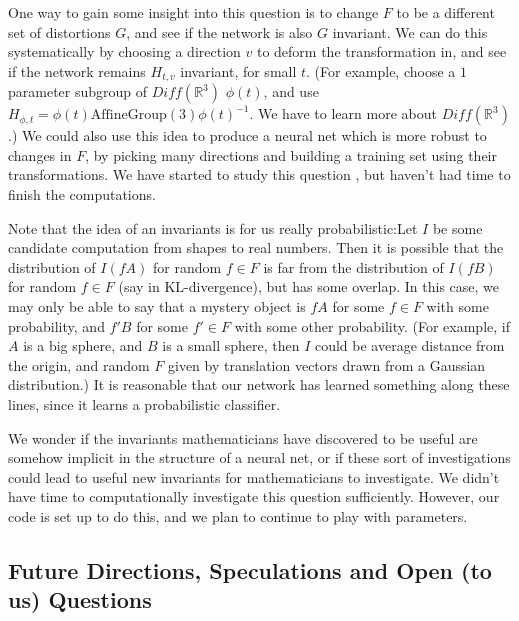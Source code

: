 \documentclass{article}
\begin{document}
One way to gain some insight into this question is to change $F$ to be a different set of distortions $G$, and see if the network is also $G$ invariant. We can do this systematically by choosing a direction $v$ to deform the transformation in, and see if the network remains $H_{t,v}$ invariant, for small $t$. (For example, choose a  $1$ parameter subgroup of $Diff(\mathbb{R}^3)$  $\phi(t)$, and use $H_{\phi, t} = \phi(t) \text{AffineGroup}(3) \phi(t)^{-1}$. We have to learn more about $Diff(\mathbb{R}^3)$.) We could also use this idea to produce a neural net which is more robust to changes in $F$, by picking many directions and building a training set using their transformations. We have started to study this question , but haven't had time to finish the computations.

Note that the idea of an invariants is for us really probabilistic:Let $I$ be some candidate computation from shapes to real numbers. Then it is possible that the distribution of $I(fA)$ for random $f \in F$ is far from the distribution of $I(fB)$ for random $f \in F$ (say in KL-divergence), but has some overlap. In this case, we may only be able to say that a mystery object is $fA$ for some $f \in F$ with some probability, and $f'B$ for some $f' \in F$ with some other probability. (For example, if $A$ is a big sphere, and $B$ is a small sphere, then $I$ could be average distance from the origin, and random $F$ given by translation vectors drawn from a Gaussian distribution.) It is reasonable that our network has learned something along these lines, since it learns a probabilistic classifier.

We wonder if the invariants mathematicians have discovered to be useful are somehow implicit in the structure of a neural net, or if these sort of investigations could lead to useful new invariants for mathematicians to investigate. We didn't have time to computationally investigate this question sufficiently. However, our code is set up to do this, and we plan to continue to play with parameters.

\subsection{Future Directions, Speculations and Open (to us) Questions}
\end{document}
